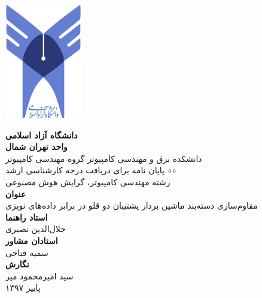 \thispagestyle{empty}

\centerline{\includegraphics[height=5cm]{logo.png}}

\begin{center}
\vspace{1cm}

\textbf{دانشگاه آزاد اسلامی}
\\[.2cm]
\textbf{واحد تهران شمال}
\\[1cm]

دانشکده برق و مهندسی کامپیوتر گروه مهندسی کامپیوتر
\\[.5cm]
پایان نامه برای دریافت درجه کارشناسی ارشد «»
\\[.2cm]
رشته مهندسی کامپیوتر، گرایش هوش مصنوعی
\\[1cm]

{\Large
\textbf{عنوان}
}
\\[0.5cm]
مقاوم‌سازی دسته‌بند ماشین بردار پشتیبان دو قلو در برابر داده‌های نویزی
\\[1cm]

{\Large
	\textbf{استاد راهنما}
}
\\[0.5cm]
جلال‌ا‌لدین نصیری
\\[1cm]

{\Large
	\textbf{استادان مشاور}
}
\\[0.5cm]
سمیه فتاحی
\\[1cm]
{\Large
	\textbf{نگارش}
}
\\[0.5cm]
سید امیرمحمود میر
\\[1cm]
پاییز ۱۳۹۷
\end{center}